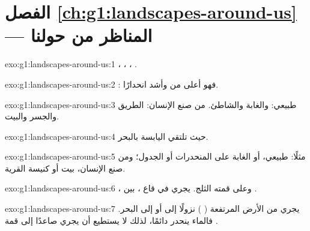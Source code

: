 \section*{الفصل \ref{ch:g1:landscapes-around-us} --- المناظر من حولنا}

\begin{solution}{exo:g1:landscapes-around-us:1}
، ، ، .
\end{solution}

\begin{solution}{exo:g1:landscapes-around-us:2}
: فهو أعلى من  وأشد انحدارًا.
\end{solution}

\begin{solution}{exo:g1:landscapes-around-us:3}
طبيعي:  والغابة والشاطئ. من صنع الإنسان: الطريق والجسر
والبيت.
\end{solution}

\begin{solution}{exo:g1:landscapes-around-us:4}
حيث تلتقي اليابسة بالبحر.
\end{solution}

\begin{solution}{exo:g1:landscapes-around-us:5}
مثلًا: طبيعي،  أو الغابة على المنحدرات أو الجدول؛ ومن صنع
الإنسان، بيت أو كنيسة القرية.
\end{solution}

\begin{solution}{exo:g1:landscapes-around-us:6}
، وعلى قمته الثلج.  يجري في قاع ، بين 
.
\end{solution}

\begin{solution}{exo:g1:landscapes-around-us:7}
يجري  من الأرض المرتفعة ( ) نزولًا إلى  أو إلى
البحر. فالماء ينحدر دائمًا، لذلك لا يستطيع أن يجري صاعدًا إلى قمة
.
\end{solution}

